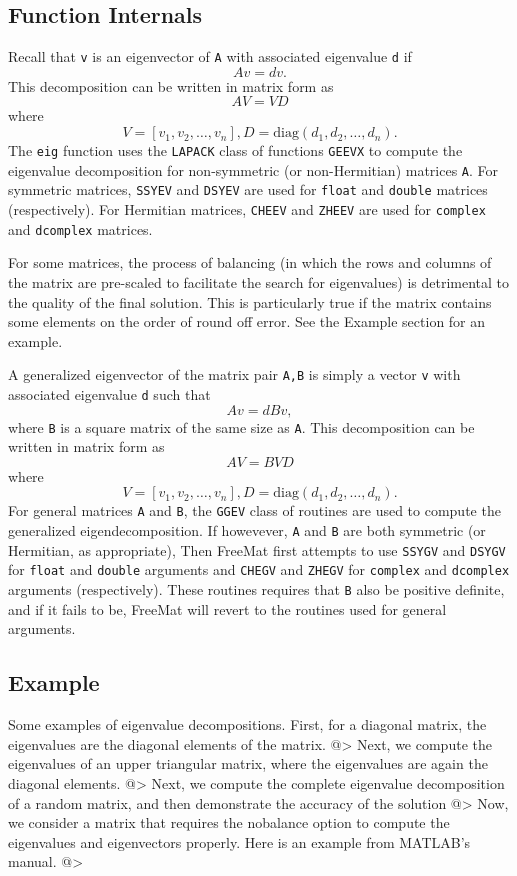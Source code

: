 \subsection{Function Internals}

Recall that \verb|v| is an eigenvector of \verb|A| with associated eigenvalue
\verb|d| if
\[
  A v = d v.
\]
This decomposition can be written in matrix form as
\[
  A V = V D
\]
where
\[
  V = [v_1,v_2,\ldots,v_n], D = \mathrm{diag}(d_1,d_2,\ldots,d_n).
\]
The \verb|eig| function uses the \verb|LAPACK| class of functions \verb|GEEVX|
to compute the eigenvalue decomposition for non-symmetric 
(or non-Hermitian) matrices \verb|A|.  For symmetric matrices, \verb|SSYEV|
 and \verb|DSYEV| are used for \verb|float| and \verb|double| matrices (respectively).
For Hermitian matrices, \verb|CHEEV| and \verb|ZHEEV| are used for \verb|complex|
and \verb|dcomplex| matrices.

For some matrices, the process of balancing (in which the rows and
columns of the matrix are pre-scaled to facilitate the search for
eigenvalues) is detrimental to the quality of the final solution.
This is particularly true if the matrix contains some elements on
the order of round off error.  See the Example section for an example.

A generalized eigenvector of the matrix pair \verb|A,B| is simply a 
vector \verb|v| with associated eigenvalue \verb|d| such that
\[
  A v = d B v,
\]
where \verb|B| is a square matrix of the same size as \verb|A|.  This
decomposition can be written in matrix form as 
\[
  A V = B V D
\]
where
\[
  V = [v_1,v_2,\ldots,v_n], D = \mathrm{diag}(d_1,d_2,\ldots,d_n).
\]
For general matrices \verb|A| and \verb|B|, the \verb|GGEV| class of routines are
used to compute the generalized eigendecomposition.  If howevever,
\verb|A| and \verb|B| are both symmetric (or Hermitian, as appropriate),
Then FreeMat first attempts to use \verb|SSYGV| and \verb|DSYGV| for \verb|float|
and \verb|double| arguments and \verb|CHEGV| and \verb|ZHEGV| for \verb|complex|
and \verb|dcomplex| arguments (respectively).  These routines requires
that \verb|B| also be positive definite, and if it fails to be, FreeMat
will revert to the routines used for general arguments.
\subsection{Example}

Some examples of eigenvalue decompositions.  First, for a diagonal
matrix, the eigenvalues are the diagonal elements of the matrix.
@>
Next, we compute the eigenvalues of an upper triangular matrix, 
where the eigenvalues are again the diagonal elements.
@>
Next, we compute the complete eigenvalue decomposition of
a random matrix, and then demonstrate the accuracy of the solution
@>
Now, we consider a matrix that requires the nobalance option
to compute the eigenvalues and eigenvectors properly.  Here is
an example from MATLAB's manual.
@>
